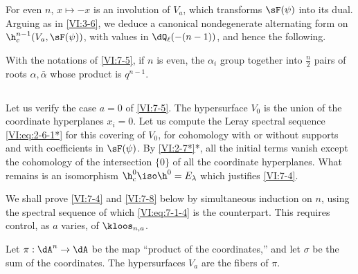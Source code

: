 For even $n$, $x\mapsto -x$ is an involution of $V_a$, which transforms 
$\sF(\psi)$ into its dual. Arguing as in \ref{VI:3-6}, we deduce a 
canonical nondegenerate alternating form on $\h_c^{n-1}(V_a,\sF(\psi))$, 
with values in $\dQ_\ell(-(n-1))$, and hence the following. 





\begin{corollary_}\label{VI:7-6}
With the notations of \ref{VI:7-5}, if $n$ is even, the $\alpha_i$ group together 
into $\frac n 2$ pairs of roots $\alpha,\bar\alpha$ whose product is 
$q^{n-1}$. 
\end{corollary_}





\subsection{}\label{VI:7-7}

Let us verify the case $a=0$ of \ref{VI:7-5}. The hypersurface $V_0$ is the union 
of the coordinate hyperplanes $x_i=0$. Let us compute the Leray spectral sequence 
\eqref{VI:eq:2-6-1*} for this covering of $V_0$, for cohomology with or 
without supports and with coefficients in $\sF(\psi)$. By \ref{VI:2-7*}*, all 
the initial terms vanish except the cohomology of the intersection $\{0\}$ of 
all the coordinate hyperplanes. What remains is an isomorphism 
$\h_c^0{}\iso \h^0{}=E_\lambda$ which justifies \ref{VI:7-4}. 

We shall prove \ref{VI:7-4} and \ref{VI:7-8} below by simultaneous induction 
on $n$, using the spectral sequence of which 
\eqref{VI:eq:7-1-4} is the counterpart. This requires control, as $a$ varies, 
of $\kloos_{n,a}$. 

Let $\pi:\dA^n \to \dA$ be the map ``product of the coordinates,'' and let 
$\sigma$ be the sum of the coordinates. The hypersurfaces $V_a$ are the fibers of 
$\pi$.





